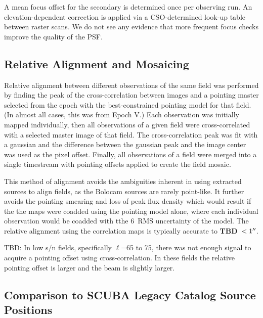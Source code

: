 \documentclass[12pt,preprint]{aastex}
\newcommand{\lon}{\ensuremath{\ell}}
\newcommand{\TBD}{{\bf TBD}}
\begin{document}
A mean focus offset for the secondary is determined once per observing
run.  An elevation-dependent correction is applied via a
CSO-determined look-up table between raster scans.  We do not see any
evidence that more frequent focus checks improve the quality of the
PSF.

\subsection{Relative Alignment and Mosaicing}

Relative alignment between different observations of the same field
was performed by finding the peak of the cross-correlation between
images and a pointing master selected from the epoch with the
best-constrained pointing model for that field. (In almost all cases,
this was from Epoch V.)  Each observation was initially mapped
individually, then all observations of a given field were
cross-correlated with a selected master image of that field. The
cross-correlation peak was fit with a gaussian and the difference
between the gaussian peak and the image center was used as the pixel
offset. 
Finally, all observations of a field were merged into a single
timestream with pointing offsets applied to create the field mosaic.

This method of alignment avoids the ambiguities inherent in using
extracted sources to align fields, as the Bolocam sources are rarely
point-like.  It further avoids the pointing smearing and loss of peak
flux density which would result if the the maps were coadded using the
pointing model alone, where each individual observation would be
coadded with tthe 6\arcsec\ RMS uncertainty of the model.  The
relative alignment using the correlation maps is typically accurate to
\TBD\ $<1\mbox{$^{\prime\prime}$}$.

TBD: In low s/n fields, specifically \lon=65 to 75, there was not enough signal to
acquire a pointing offset using cross-correlation.  In these fields the
relative pointing offset is larger and the beam is slightly larger.

\subsection{Comparison to SCUBA Legacy Catalog Source Positions}
\label{sec:SCUBAPointingComparison}
\end{document}
